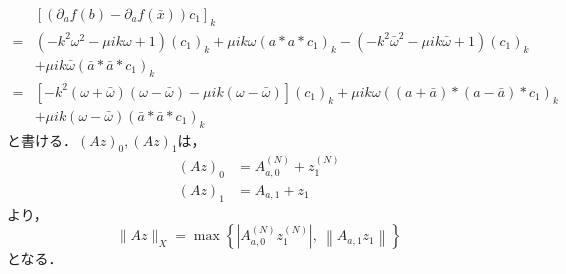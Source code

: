 \documentclass[11pt,a4paper,titlepage]{jsreport}
\theoremstyle{definition}
\begin{document}
\begin{equation*}
  \begin{split}
    &\left[ \left( \partial_a f(b) - \partial_a f(\bar{x}) \right){c_1} \right]_k \\
    =& \left( -k^2\omega^2 - \mu ik \omega + 1 \right) \left( c_1 \right)_k + \mu ik \omega (a * a * c_1)_k - \left( -k^2\bar{\omega}^2 - \mu ik \bar{\omega} + 1 \right) \left( c_1 \right)_k \\
    &+ \mu ik \bar{\omega} (\bar{a} * \bar{a} * c_1)_k \\
    =& \left[ -k^2\left(\omega + \bar{\omega}\right) \left(\omega - \bar{\omega}\right) - \mu ik \left(\omega - \bar{\omega}\right) \right] \left(c_1\right)_k + \mu ik \omega \left(\left(a+\bar{a}\right)*\left(a-\bar{a}\right)*c_1\right)_k \\
    &+ \mu ik \left(\omega - \bar{\omega}\right) \left( \bar{a} * \bar{a} * c_1 \right)_k
  \end{split}
\end{equation*}
と書ける．$(Az)_0,(Az)_1$は，
\begin{align*}
  (Az)_0 & = A_{a,0}^{(N)} + z_1^{(N)} \\
  (Az)_1 & = A_{a,1} + z_1
\end{align*}
より，
\begin{equation*}
  \|Az\|_X = \max\left\{ \left| A_{a,0}^{(N)} z_1^{(N)} \right|,\ \left\| A_{a,1} z_1 \right\| \right\}
\end{equation*}
となる．
\end{document}
